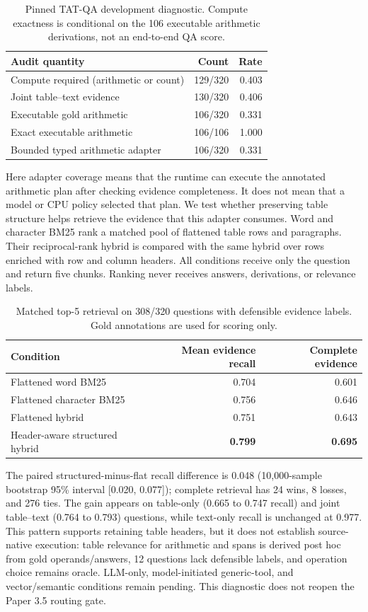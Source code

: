 \documentclass[11pt]{article}
\begin{document}
\begin{table}[t]
\centering\small
\caption{Pinned TAT-QA development diagnostic. Compute exactness is conditional
on the 106 executable arithmetic derivations, not an end-to-end QA score.}
\label{tab:p25-tatqa}
\begin{tabular}{lrr}
\toprule
Audit quantity & Count & Rate\\
\midrule
Compute required (arithmetic or count) & 129/320 & 0.403\\
Joint table--text evidence & 130/320 & 0.406\\
Executable gold arithmetic & 106/320 & 0.331\\
Exact executable arithmetic & 106/106 & 1.000\\
Bounded typed arithmetic adapter & 106/320 & 0.331\\
\bottomrule
\end{tabular}
\end{table}

Here adapter coverage means that the runtime can execute the annotated
arithmetic plan after checking evidence completeness. It does not mean that a
model or CPU policy selected that plan. We test whether preserving table
structure helps retrieve the evidence that this adapter consumes. Word and character BM25 rank a
matched pool of flattened table rows and paragraphs. Their reciprocal-rank
hybrid is compared with the same hybrid over rows enriched with row and column
headers. All conditions receive only the question and return five chunks.
Ranking never receives answers, derivations, or relevance labels.

\begin{table}[t]
\centering\small
\caption{Matched top-5 retrieval on 308/320 questions with defensible evidence
labels. Gold annotations are used for scoring only.}
\label{tab:p25-tatqa-retrieval}
\begin{tabular}{lrr}
\toprule
Condition & Mean evidence recall & Complete evidence\\
\midrule
Flattened word BM25 & 0.704 & 0.601\\
Flattened character BM25 & 0.756 & 0.646\\
Flattened hybrid & 0.751 & 0.643\\
Header-aware structured hybrid & \textbf{0.799} & \textbf{0.695}\\
\bottomrule
\end{tabular}
\end{table}

The paired structured-minus-flat recall difference is 0.048 (10,000-sample
bootstrap 95\% interval [0.020, 0.077]); complete retrieval has 24 wins, 8
losses, and 276 ties. The gain appears on table-only (0.665 to 0.747 recall) and
joint table--text (0.764 to 0.793) questions, while text-only recall is unchanged
at 0.977. This pattern supports retaining table headers, but it does not
establish source-native execution: table relevance for arithmetic and spans is
derived post hoc from gold operands/answers, 12 questions lack defensible labels,
and operation choice remains oracle. LLM-only, model-initiated generic-tool, and
vector/semantic conditions remain pending. This diagnostic does not reopen the
Paper 3.5 routing gate.
\end{document}
